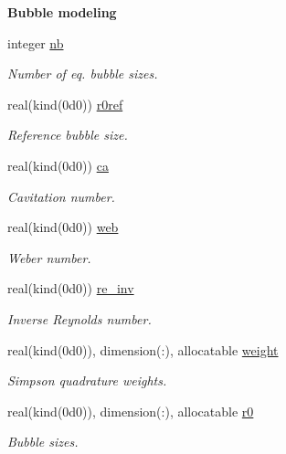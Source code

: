 \begin{Indent}\textbf{ Bubble modeling}\par
\begin{DoxyCompactItemize}
\item 
integer \hyperlink{namespacem__global__parameters_ad76c4758994b52559f478d251dc0cba5}{nb}
\begin{DoxyCompactList}\small\item\em Number of eq. bubble sizes. \end{DoxyCompactList}\item 
real(kind(0d0)) \hyperlink{namespacem__global__parameters_a24492f9b474683476a342e7ee42c1c6d}{r0ref}
\begin{DoxyCompactList}\small\item\em Reference bubble size. \end{DoxyCompactList}\item 
real(kind(0d0)) \hyperlink{namespacem__global__parameters_a1fcd6cc13ad7f604ef81708716a1feac}{ca}
\begin{DoxyCompactList}\small\item\em Cavitation number. \end{DoxyCompactList}\item 
real(kind(0d0)) \hyperlink{namespacem__global__parameters_af2ed21959a90158c2459574230cdfcff}{web}
\begin{DoxyCompactList}\small\item\em Weber number. \end{DoxyCompactList}\item 
real(kind(0d0)) \hyperlink{namespacem__global__parameters_a4438313a11564fa911c586d2dee15b8d}{re\+\_\+inv}
\begin{DoxyCompactList}\small\item\em Inverse Reynolds number. \end{DoxyCompactList}\item 
real(kind(0d0)), dimension(\+:), allocatable \hyperlink{namespacem__global__parameters_a121ed97f0ae913d37bce5bbf1c7b2cc2}{weight}
\begin{DoxyCompactList}\small\item\em Simpson quadrature weights. \end{DoxyCompactList}\item 
real(kind(0d0)), dimension(\+:), allocatable \hyperlink{namespacem__global__parameters_a585a72037bbffe12e8d4512a57f52418}{r0}
\begin{DoxyCompactList}\small\item\em Bubble sizes. \end{DoxyCompactList}\item 

\end{DoxyCompactItemize}
\end{Indent}
